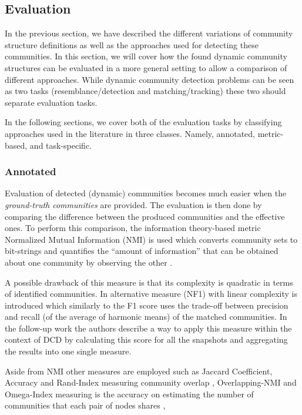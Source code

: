 \documentclass[
acmsmall,
nonacm,
screen,
acmthm]{acmart}
\begin{document}
\hypertarget{evaluation}{%
\subsection{Evaluation}\label{evaluation}}

In the previous section, we have described the different variations of
community structure definitions as well as the approaches used for
detecting these communities. In this section, we will cover how the
found dynamic community structures can be evaluated in a more general
setting to allow a comparison of different approaches. While dynamic
community detection problems can be seen as two tasks
(resemblance/detection and matching/tracking) these two should separate
evaluation tasks.

In the following sections, we cover both of the evaluation tasks by
classifying approaches used in the literature in three classes. Namely,
annotated, metric-based, and task-specific.

\hypertarget{annotated}{%
\subsubsection{Annotated}\label{annotated}}

Evaluation of detected (dynamic) communities becomes much easier when
the \emph{ground-truth communities} are provided. The evaluation is then
done by comparing the difference between the produced communities and
the effective ones. To perform this comparison, the information
theory-based metric Normalized Mutual Information (NMI) is used which
converts community sets to bit-strings and quantifies the ``amount of
information'' that can be obtained about one community by observing the
other \citep{lancichinettiDetectingOverlappingHierarchical2009}.

A possible drawback of this measure is that its complexity is quadratic
in terms of identified communities. In
\citep{rossettiNovelApproachEvaluate2016} alternative measure (NF1) with
linear complexity is introduced which similarly to the F1 score uses the
trade-off between precision and recall (of the average of harmonic
means) of the matched communities. In the follow-up work
\citep{rossettiANGELEfficientEffective2020} the authors describe a way
to apply this measure within the context of DCD by calculating this
score for all the snapshots and aggregating the results into one single
measure.

Aside from NMI other measures are employed such as Jaccard Coefficient,
Accuracy and Rand-Index measuring community overlap
\citep{yangGraphClusteringDynamic2017, mrabahRethinkingGraphAutoEncoder2021, luoDetectingCommunitiesHeterogeneous2021},
Overlapping-NMI \citep{yeDeepAutoencoderlikeNonnegative2018} and
Omega-Index measuring is the accuracy on estimating the number of
communities that each pair of nodes shares
\citep{yangCommunityAffiliationGraphModel2012},
\end{document}
